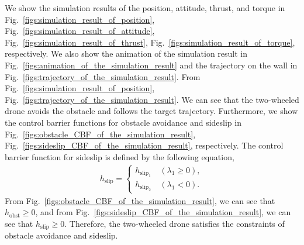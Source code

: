 We show the simulation results of the position, attitude, thrust, and torque in Fig.~\ref{figs:simulation_result_of_position}, Fig.~\ref{figs:simulation_result_of_attitude}, Fig.~\ref{figs:simulation_result_of_thrust}, Fig.~\ref{figs:simulation_result_of_torque}, respectively.
We also show the animation of the simulation result in Fig.~\ref{figs:animation_of_the_simulation_result} and the trajectory on the wall in Fig.~\ref{figs:trajectory_of_the_simulation_result}.
From Fig.~\ref{figs:simulation_result_of_position}, Fig.~\ref{figs:trajectory_of_the_simulation_result}.
We can see that the two-wheeled drone avoids the obstacle and follows the target trajectory.
Furthermore, we show the control barrier functions for obstacle avoidance and sideslip in Fig.~\ref{figs:obstacle_CBF_of_the_simulation_result}, Fig.~\ref{figs:sideslip_CBF_of_the_simulation_result}, respectively.
The control barrier function for sideslip is defined by the following equation,
\begin{align}
  h_{\mathrm{slip}} =
  \begin{cases}
     h_{\mathrm{slip}_1} &~ (\lambda_1 \geq 0), \\
     h_{\mathrm{slip}_2} &~ (\lambda_1 < 0).
    \label{eq:definition_of_h_slip}
  \end{cases}
\end{align}
From Fig.~\ref{figs:obstacle_CBF_of_the_simulation_result}, we can see that $ h_{\mathrm{obst}} \geq 0 $, and from Fig.~\ref{figs:sideslip_CBF_of_the_simulation_result}, we can see that $ h_{\mathrm{slip}} \geq 0 $.
Therefore, the two-wheeled drone satisfies the constraints of obstacle avoidance and sideslip.